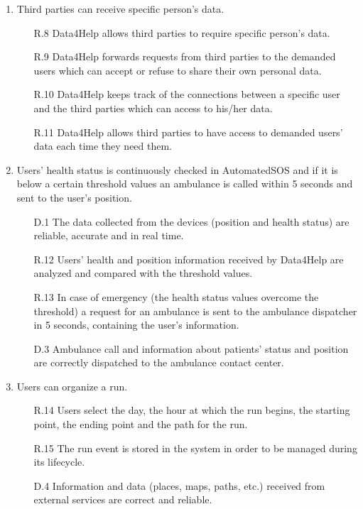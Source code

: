 \documentclass[a4paper]{article}
\begin{document}
\begin{enumerate}[label*=\bf{G.\arabic*}]
        
        \item Third parties can receive specific person's data.
                
        \begin{enumerate}
                \item[R.8] Data4Help allows third parties to require specific person's data. 
                \item [R.9] Data4Help forwards requests from third parties to the demanded users which can accept or refuse to share their own personal data.
                \item [R.10] Data4Help keeps track of the connections between a specific user and the third parties which can access to his/her data.
                \item [R.11] Data4Help allows third parties to have access to demanded users' data each time they need them.
            \end{enumerate}
                
            
        \item Users' health status is continuously checked in AutomatedSOS and if it is below a certain threshold values an ambulance is called within 5 seconds and sent to the user's position.
    
        \begin{enumerate}
            \item [D.1] The data collected from the devices (position and health status) are reliable, accurate and in real time.
            \item [R.12] Users' health and position information received by Data4Help are analyzed and compared with the threshold values.
            \item [R.13] In case of emergency (the health status values overcome the threshold) a request for an ambulance is sent to the ambulance dispatcher in 5 seconds, containing the user's information.
            \item [D.3] Ambulance call and information about patients' status and position are correctly dispatched to the ambulance contact center.
        \end{enumerate}
        
        \item Users can organize a run.
        
        \begin{enumerate}
            \item [R.14] Users select the day, the hour at which the run begins, the starting point, the ending point and the path for the run.
            \item [R.15] The run event is stored in the system in order to be managed during its lifecycle.
            \item [D.4] Information and data (places, maps, paths, etc.) received from external services are correct and reliable.
        \end{enumerate}
        

\end{enumerate}
\end{document}
